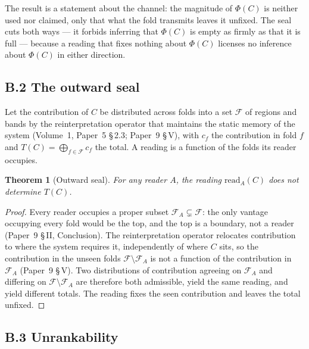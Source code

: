 \documentclass[11pt,oneside]{report}
\newtheorem{theorem}{Theorem}[section]
\theoremstyle{definition}
\theoremstyle{remark}
\begin{document}
\noindent The result is a statement about the channel: the magnitude of \ensuremath{\Phi(C)} is neither used nor claimed, only that what the fold transmits leaves it unfixed. The seal cuts both ways --- it forbids inferring that \ensuremath{\Phi(C)} is empty as firmly as that it is full --- because a reading that fixes nothing about \ensuremath{\Phi(C)} licenses no inference about \ensuremath{\Phi(C)} in either direction.

\subsection*{B.2 The outward seal}

Let the contribution of \ensuremath{C} be distributed across folds into a set \ensuremath{\mathcal{F}} of regions and bands by the reinterpretation operator that maintains the static memory of the system (Volume~1, Paper~5 \S\,2.3; Paper~9 \S\,V), with \ensuremath{c_f} the contribution in fold \ensuremath{f} and \ensuremath{T(C) = \bigoplus_{f \in \mathcal{F}} c_f} the total. A reading is a function of the folds its reader occupies.

\begin{theorem}[Outward seal]
For any reader \ensuremath{A}, the reading \ensuremath{\mathrm{read}_A(C)} does not determine \ensuremath{T(C)}.
\end{theorem}

\begin{proof}
Every reader occupies a proper subset \ensuremath{\mathcal{F}_A \subsetneq \mathcal{F}}: the only vantage occupying every fold would be the top, and the top is a boundary, not a reader (Paper~9 \S\,II, Conclusion). The reinterpretation operator relocates contribution to where the system requires it, independently of where \ensuremath{C} sits, so the contribution in the unseen folds \ensuremath{\mathcal{F} \setminus \mathcal{F}_A} is not a function of the contribution in \ensuremath{\mathcal{F}_A} (Paper~9 \S\,V). Two distributions of contribution agreeing on \ensuremath{\mathcal{F}_A} and differing on \ensuremath{\mathcal{F} \setminus \mathcal{F}_A} are therefore both admissible, yield the same reading, and yield different totals. The reading fixes the seen contribution and leaves the total unfixed.
\end{proof}

\subsection*{B.3 Unrankability}
\end{document}

